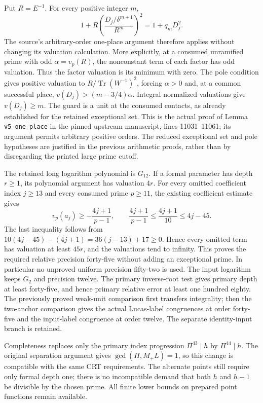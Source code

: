 Put $R=E^{-1}$. For every positive integer $m$,
\[
 1+R\left(\frac{D_j/\delta^{m+1}}{R^m}\right)^2
   =1+q_mD_j^2.
\]
The source's arbitrary-order one-place argument therefore applies
without changing its valuation calculation. More explicitly, at a
consumed unramified prime with odd $\alpha=v_p(R)$, the nonconstant term
of each factor has odd valuation. Thus the factor valuation is its
minimum with zero. The pole condition gives positive valuation to
$R/\operatorname{Tr}(W^{-1})^2$, forcing $\alpha>0$ and, at a common
successful place, $v(D_j)>(m-3/4)\alpha$. Integral normalized valuations
give $v(D_j)\ge m$. The guard is a unit at the consumed contacts, as
already established for the retained exceptional set. This is the actual
proof of Lemma \texttt{v5-one-place} in the pinned upstream manuscript,
lines 11031--11061; its argument permits arbitrary positive orders.
The reduced exceptional set and pole hypotheses are justified in the
previous arithmetic proofs, rather than by disregarding the printed
large prime cutoff.

The retained long logarithm polynomial is $G_{12}$. If a formal
parameter has depth $r\ge1$, its polynomial argument has valuation $4r$.
For every omitted coefficient index $j\ge13$ and every consumed prime
$p\ge11$, the existing coefficient estimate gives
\[
 v_p(a_j)\ge-\frac{4j+1}{p-1},\qquad
 \frac{4j+1}{p-1}\le\frac{4j+1}{10}\le4j-45.
\]
The last inequality follows from
$10(4j-45)-(4j+1)=36(j-13)+17\ge0$.
Hence every omitted term has valuation at least $45r$, and the valuations
tend to infinity. This proves the required relative precision forty-five
without adding an exceptional prime. In particular no unproved uniform
precision fifty-two is used. The input logarithm keeps $G_2$ and precision
twelve. The primary inverse-root test gives primary depth at least
forty-five, and hence primary relative error at least one hundred eighty.
The previously proved weak-unit comparison first transfers integrality;
then the two-anchor comparison gives the actual Lucas-label congruences
at order forty-five and the input-label congruence at order twelve.
The separate identity-input branch is retained.

Completeness replaces only the primary index progression $\Pi^{43}\mid h$
by $\Pi^{44}\mid h$. The original separation argument gives
$\gcd(\Pi,M_+L)=1$, so this change is compatible with the same CRT
requirements. The alternate points still require only formal depth one;
there is no incompatible demand that both $h$ and $h-1$ be divisible by
the chosen prime. All finite lower bounds on prepared point functions
remain available.

